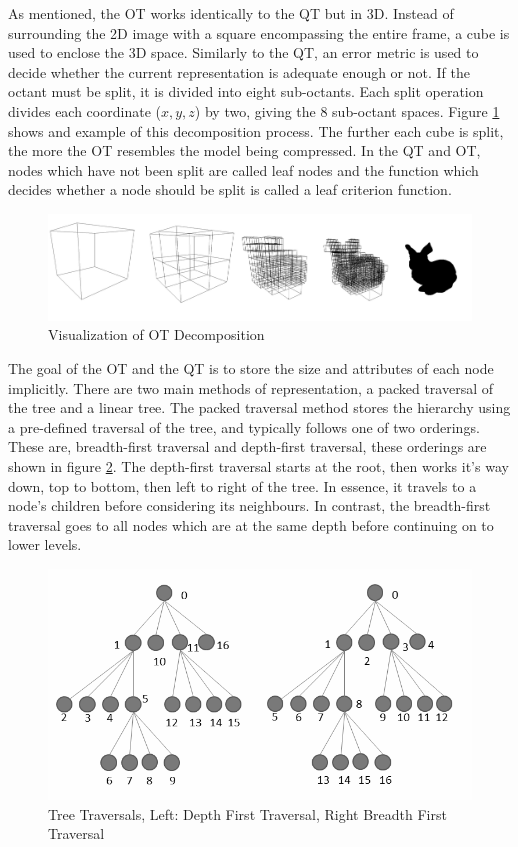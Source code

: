 As mentioned, the OT works identically to the QT but in 3D. Instead of surrounding the 2D image with a square encompassing the entire frame, a cube is used to enclose the 3D space. Similarly to the QT, an error metric is used to decide whether the current representation is adequate enough or not. If the octant must be split, it is divided into eight sub-octants. Each split operation divides each coordinate ($x,y,z$) by two, giving the 8 sub-octant spaces. Figure \ref{OctreeExample} shows and example of this decomposition process. The further each cube is split, the more the OT resembles the model being compressed. In the QT and OT, nodes which have not been split are called leaf nodes and the function which decides whether a node should be split is called a leaf criterion function. \\ 

\begin{figure}[!htb]
\centering
\includegraphics[width=16cm]{images/ch2/OctreeExample}
\caption{Visualization of OT Decomposition}
\label{OctreeExample}
\end{figure}

The goal of the OT and the QT is to store the size and attributes of each node implicitly. There are two main methods of representation, a packed traversal of the tree and a linear tree. The packed traversal method stores the hierarchy using a pre-defined traversal of the tree, and typically follows one of two orderings. These are, breadth-first traversal and depth-first traversal, these orderings are shown in figure \ref{TreeTraversalExample}. The depth-first traversal starts at the root, then works it's way down, top to bottom, then left to right of the tree. In essence, it travels to a node's children before considering its neighbours. In contrast, the breadth-first traversal goes to all nodes which are at the same depth before continuing on to lower levels. \\


\begin{figure}[!htb]
\centering
\includegraphics[width=12cm]{images/ch2/TreeTraversalExample}
\caption{Tree Traversals, Left: Depth First Traversal, Right Breadth First Traversal}
\label{TreeTraversalExample}
\end{figure}

